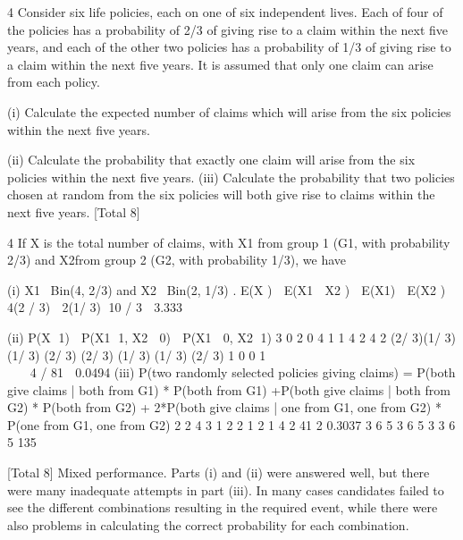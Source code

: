 \documentclass[a4paper,12pt]{article}
\begin{document}
4 Consider six life policies, each on one of six independent lives. Each of four of the
policies has a probability of 2/3 of giving rise to a claim within the next five years,
and each of the other two policies has a probability of 1/3 of giving rise to a claim
within the next five years. It is assumed that only one claim can arise from each
policy.
\item (i) Calculate the expected number of claims which will arise from the six policies
within the next five years. 
\item (ii) Calculate the probability that exactly one claim will arise from the six policies
within the next five years. 
(iii) Calculate the probability that two policies chosen at random from the six
policies will both give rise to claims within the next five years. 
[Total 8]

4 If X is the total number of claims, with X1 from group 1 (G1, with probability 2/3) and
X2from group 2 (G2, with probability 1/3), we have
\item (i) X1~ Bin(4, 2/3) and X2~ Bin(2, 1/3) .
E(X )  E(X1  X2 )  E(X1)  E(X2 )
 4(2 / 3)  2(1/ 3) 10 / 3  3.333 
\item (ii) P(X 1)  P(X1 1, X2  0)  P(X1  0, X2 1)
3 0 2 0 4 1 1 4 2 4 2
(2/ 3)(1/ 3) (1/ 3) (2/ 3) (2/ 3) (1/ 3) (1/ 3) (2/ 3)
1 0 0 1
       
         
       
 4 / 81  0.0494 
(iii) P(two randomly selected policies giving claims) =
  P(both give claims | both from G1) * P(both from G1)
+P(both give claims | both from G2) * P(both from G2)
+ 2*P(both give claims | one from G1, one from G2) * P(one from G1, one
                                                       from G2)
2 2 4 3 1 2 2 1 2 1 4 2 41 2 0.3037
3 6 5 3 6 5 3 3 6 5 135
                   
      

[Total 8]
Mixed performance. Parts (i) and (ii) were answered well, but there were many inadequate
attempts in part (iii). In many cases candidates failed to see the different combinations
resulting in the required event, while there were also problems in calculating the correct
probability for each combination.
\end{document}
